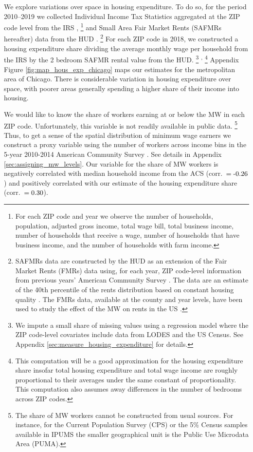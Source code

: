 We explore variations over space in housing expenditure.
To do so, for the period 2010--2019
we collected Individual Income Tax Statistics aggregated at the ZIP code level 
from the IRS \parencite{IRS},%
\footnote{For each ZIP code and year we observe the number of households, 
population, adjusted gross income, total wage bill, total business income, 
number of households that receive a wage, number of households that have 
business income, and the number of households with farm income.}
and Small Area Fair Market Rents (SAFMRs hereafter) data from the HUD 
\parencite{hudSAFMR}.%
\footnote{SAFMRs data are constructed by the HUD as an extension of the
Fair Market Rents (FMRs) data using, for each year, ZIP code-level information
from previous years' American Community Survey 
\parencite[][, p.\ 35]{SafmrReport2018}.
The data are an estimate of the 40th percentile of the rents distribution
based on constant housing quality \parencite[][, p.\ 1]{SafmrReport2018}.
The FMRs data, available at the county and year levels, have been used to study 
the effect of the MW on rents in the US \parencite{Tidemann2018, Yamagishi2019}.}
For each ZIP code in 2018, we constructed a housing expenditure share dividing 
the average monthly wage per household from the IRS by the 2 bedroom SAFMR 
rental value from the HUD.%
\footnote{We impute a small share of missing values using a regression model 
where the ZIP code-level covariates include data from LODES and the US Census.
See Appendix \ref{sec:measure_housing_expenditure} for details.}%
\textsuperscript{,}%
\footnote{This computation will be a good approximation for the housing 
expenditure share insofar total housing expenditure and total wage income are 
roughly proportional to their averages under the same constant of 
proportionality.
This computation also assumes away differences in the number of bedrooms across 
ZIP codes.}
Appendix Figure \ref{fig:map_hous_exp_chicago} maps our estimates for the 
metropolitan area of Chicago.
There is considerable variation in housing expenditure over space, with poorer
areas generally spending a higher share of their income into housing.

We would like to know the share of workers earning at or below the MW in each 
ZIP code.
Unfortunately, this variable is not readily available in public data.%
\footnote{The share of MW workers cannot be constructed from usual sources.
For instance, for the Current Population Survey (CPS) or the 5\% Census 
samples available in IPUMS the smaller geographical unit is the Public Use 
Microdata Area (PUMA).}
Thus, to get a sense of the spatial distribution of minimum wage earners we 
construct a proxy variable using the number of workers across income bins
in the 5-year 2010-2014 American Community Survey \parencite[ACS;][]{CensusACS}.
See details in Appendix \ref{sec:assigning_mw_levels}.
Our variable for the share of MW workers is negatively correlated with median 
household income from the ACS (corr.\ $=\textnormal{-0.26}$) and 
positively correlated with our estimate of the housing expenditure share 
(corr.\ $=\textnormal{0.30}$).

